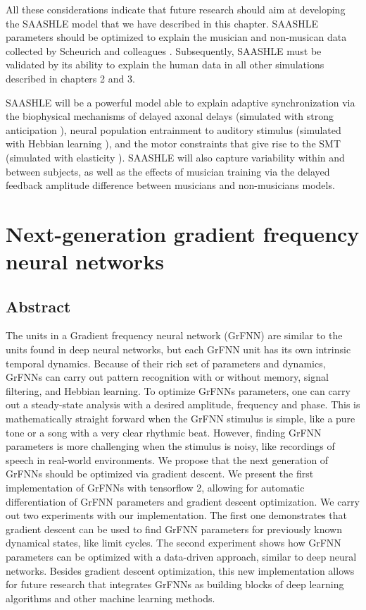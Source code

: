 \documentclass{report}
\begin{document}
All these considerations indicate that future research should aim at developing the SAASHLE model that we have described in this chapter. SAASHLE parameters should be optimized to explain the musician and non-musican data collected by Scheurich and colleagues \cite{scheurich2018tapping}. Subsequently, SAASHLE must be validated by its ability to explain the human data in all other simulations described in chapters 2 and 3. 

SAASHLE will be a powerful model able to explain adaptive synchronization via the biophysical mechanisms of delayed axonal delays (simulated with strong anticipation \cite{stepp2010strong}), neural population entrainment to auditory stimulus (simulated with Hebbian learning \cite{righetti2006dynamic}), and the motor constraints that give rise to the SMT (simulated with elasticity \cite{lambert2016adaptive}). SAASHLE will also capture variability within and between subjects, as well as the effects of musician training via the delayed feedback amplitude difference between musicians and non-musicians models. 


\chapter{Next-generation gradient frequency neural networks}

\section{Abstract}
The units in a Gradient frequency neural network (GrFNN) are similar to the units found in deep neural networks, but each GrFNN unit has its own intrinsic temporal dynamics. Because of their rich set of parameters and dynamics, GrFNNs can carry out pattern recognition with or without memory, signal filtering, and Hebbian learning. To optimize GrFNNs parameters, one can carry out a steady-state analysis with a desired amplitude, frequency and phase. This is mathematically straight forward when the GrFNN stimulus is simple, like a pure tone or a song with a very clear rhythmic beat. However, finding GrFNN parameters is more challenging when the stimulus is noisy, like recordings of speech in real-world environments. We propose that the next generation of GrFNNs should be optimized via gradient descent. We present the first implementation of GrFNNs with tensorflow 2, allowing for automatic differentiation of GrFNN parameters and gradient descent optimization. We carry out two experiments with our implementation. The first one demonstrates that gradient descent can be used to find GrFNN parameters for previously known dynamical states, like limit cycles. The second experiment shows how GrFNN parameters can be optimized with a data-driven approach, similar to deep neural networks. Besides gradient descent optimization, this new implementation allows for future research that integrates GrFNNs as building blocks of deep learning algorithms and other machine learning methods.
\end{document}
